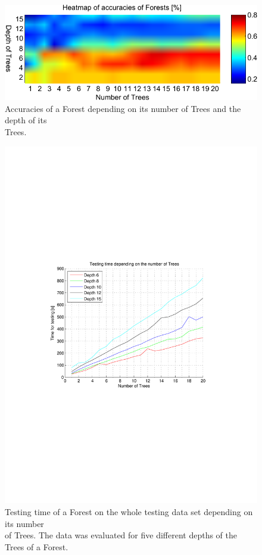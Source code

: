 \documentclass[twocolumn]{article}
\begin{document}
\onecolumn
\begin{figure}[t] 
\centering
\includegraphics[width=\textwidth]{Diagrams/Forests_Heatmap_Gini_15_20}
\caption{Accuracies of a Forest depending on its number of Trees and the depth of its\\\phantom{Figure 1: }Trees.}
\label{forest_heatmap}
\end{figure}
\begin{figure}[t] 
\centering
\includegraphics{Diagrams/Forests_Testing_Times_Gini_15_20}
\caption{Testing time of a Forest on the whole testing data set depending on its number\\\phantom{Figure 2: }of Trees. The data was evaluated for five different depths of the Trees of a Forest.}
\label{forest_testing_time}
\end{figure}
\twocolumn
\end{document}
